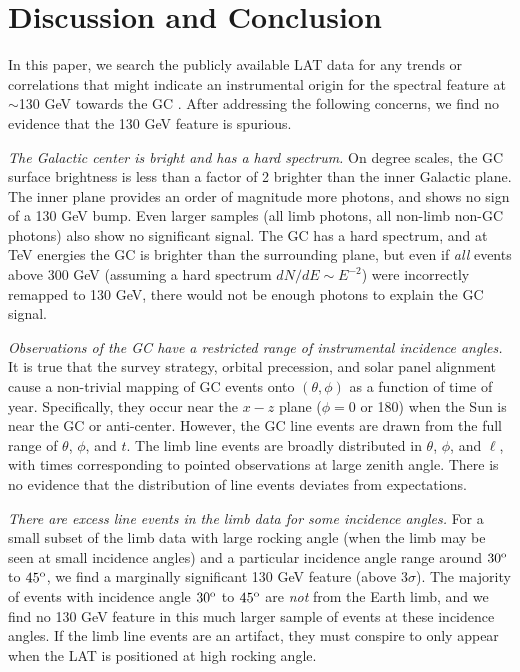 \documentclass[aps,twocolumn,prd,superscriptaddress,showpacs,nofootinbib,fixfloat]{revtex4}
\newcommand{\degree}{^{\rm o}}
\begin{document}


\section{Discussion and Conclusion}
\label{sec:Conclusion}

In this paper, we search the publicly available LAT data for any trends or
correlations that might indicate an instrumental origin for the spectral
feature at $\sim$130 GeV towards the GC \citep{Bringmann:2012, Weniger:2012, linepaper}. 
After addressing the following concerns, we find no evidence that the 130 GeV
feature is spurious. 
\medskip

\emph{The Galactic center is bright and has a hard spectrum.} On degree
scales, the GC surface brightness is less than a factor of 2 brighter than the
inner Galactic plane.  The inner plane provides an order of magnitude more
photons, and shows no sign of a 130 GeV bump.  Even larger samples (all limb
photons, all non-limb non-GC photons) also show no significant signal.  The GC has a hard
spectrum, and at TeV energies the
GC is brighter than the surrounding plane, but even if \emph{all} events above
300 GeV (assuming a hard spectrum $dN/dE\sim E^{-2}$) were incorrectly remapped
to 130 GeV, there would not be enough photons to explain the GC signal.

\emph{Observations of the GC have a restricted range of instrumental incidence
  angles.}  It is true that the survey strategy, orbital precession, and solar
panel alignment cause a non-trivial mapping of GC events onto $(\theta, \phi)$
as a function of time of year.  Specifically, they occur near the $x-z$ plane
($\phi=0$ or 180) when the Sun is near the GC or anti-center.  However, the GC
line events are drawn from the full range of $\theta$, $\phi$, and $t$.  The
limb line events are broadly distributed in $\theta$, $\phi$, and $\ell$, with
times corresponding to pointed observations at large zenith angle.  There is no
evidence that the distribution of line events deviates from expectations.

\emph{There are excess line events in the limb data for some incidence angles.}
For a small subset of the limb data with large rocking angle (when the limb may
be seen at small incidence angles) and a particular incidence angle range
around $30\degree$ to $45\degree$, we find a marginally significant 130 GeV feature
(above $3\sigma$).  
The majority of events with incidence angle $30\degree$ to
$45\degree$ are \emph{not} from the Earth limb, and we find no 130 GeV
feature in this much larger sample of events at these incidence angles.  If the
limb line events are an artifact, they must conspire to only appear when the
LAT is positioned at high rocking angle. 
\end{document}
